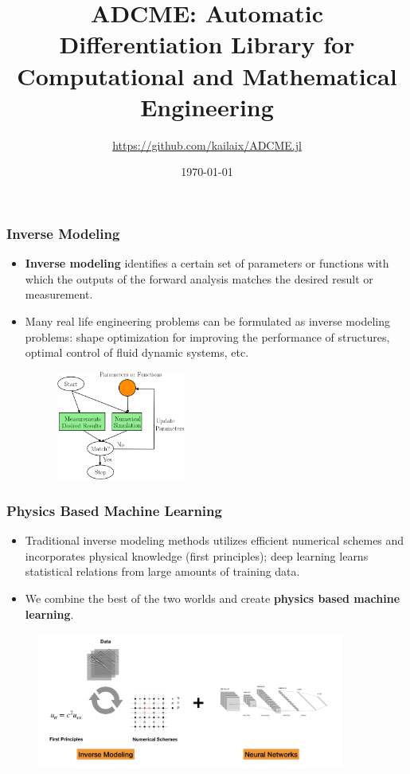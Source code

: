 \documentclass{beamer}
\title[ADCME]{ADCME: Automatic Differentiation Library for Computational and Mathematical Engineering} %
\author{\url{https://github.com/kailaix/ADCME.jl}} %
\institute[] %
{
}
\date{\today} %
\begin{document}
\begin{frame}
\titlepage %

\end{frame}


\begin{frame}
	\frametitle{Inverse Modeling}
	\begin{itemize}
		\item \textbf{Inverse modeling} identifies a certain set of parameters or functions with which the outputs of the forward analysis matches the desired result or measurement.
		\item Many real life engineering problems can be formulated as inverse modeling problems: shape optimization for improving the performance of structures, optimal control of fluid dynamic systems, etc.
		\begin{figure}[hbt]
  \includegraphics[width=0.4\textwidth]{../im.png}
\end{figure}

	\end{itemize}
\end{frame}

\begin{frame}
	\frametitle{Physics Based Machine Learning}
	\begin{itemize}
		\item Traditional inverse modeling methods utilizes efficient numerical schemes and incorporates physical knowledge (first principles); deep learning learns statistical relations from large amounts of training data.
		\item We combine the best of the two worlds and create \textbf{physics based machine learning}. 
	\end{itemize}
	\begin{figure}[hbt]
  \includegraphics[width=0.9\textwidth]{../physics_based_machine_learning.png}
\end{figure}
\end{frame}
\end{document}
